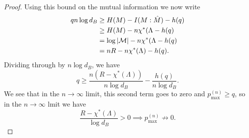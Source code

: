 \begin{proof}
    Using this bound on the mutual information we now write
    \begin{align*}
        q n \log d_B &\geq H(M) - I(M:\hat M) - h(q)\\
        &\geq H(M) -n \chi^*(\Lambda -h(q)\\
        &= \log|\mathcal{M}|-n \chi^*(\Lambda -h(q)\\
        &= nR - n\chi^*(\Lambda)-h(q).
    \end{align*}
    Dividing through by $n\log d_B$, we have
    \begin{equation}
        q \geq \frac{ n(R-\chi^*(\Lambda))}{n\log d_B} -\frac{h(q)}{n\log d_B}.
    \end{equation}
    We see that in the $n\to \infty$ limit, this second term goes to zero and $p_{\max}^{(n)}\geq q$, so in the $n\to\infty$ lmit we have
    \begin{equation}
        \frac{R-\chi^*(\Lambda)}{\log d_B} > 0 \implies p_{\max}^{(n)} \not \to 0.
    \end{equation}
\end{proof}
